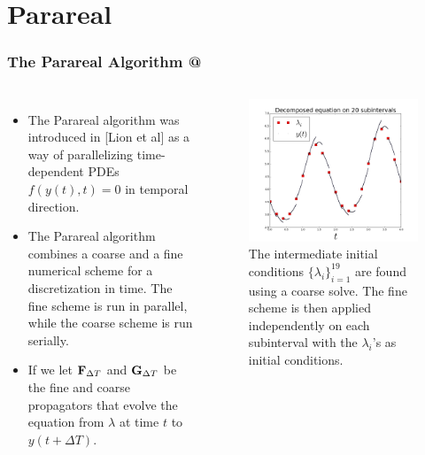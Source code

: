 \documentclass[9pt]{beamer}
\makeatletter
\newcommand*{\rom}[1]{\expandafter\@slowromancap\romannumeral #1@}
\makeatother
\begin{document}
\section{Parareal}
\begin{frame}
\frametitle{The Parareal Algorithm \rom{1}}
\begin{columns}
\begin{itemize}
\item{The Parareal algorithm was introduced in [Lion et al] as a way of parallelizing time-dependent PDEs $f(y(t),t)=0$ in temporal direction.}
\item{The Parareal algorithm combines a coarse and a fine numerical scheme for a discretization in time. The fine scheme is run in parallel, while the coarse scheme is run serially.}
\item{If we let $\bold{F}_{\Delta T}$ and $\bold{G}_{\Delta T}$ be the fine and coarse propagators that evolve the equation from $\lambda$ at time $t$ to $y(t+\Delta T)$.}
\end{itemize}
\begin{figure}
\includegraphics[scale=0.2]{parareal.png}
\caption{{\small 
The intermediate initial conditions $\{\lambda_i\}_{i=1}^{19}$ are found using a coarse solve. The fine scheme is then applied independently on each subinterval with the $\lambda_i$'s as initial conditions.
}}
\end{figure}
\end{columns}
\end{frame}
\end{document}
